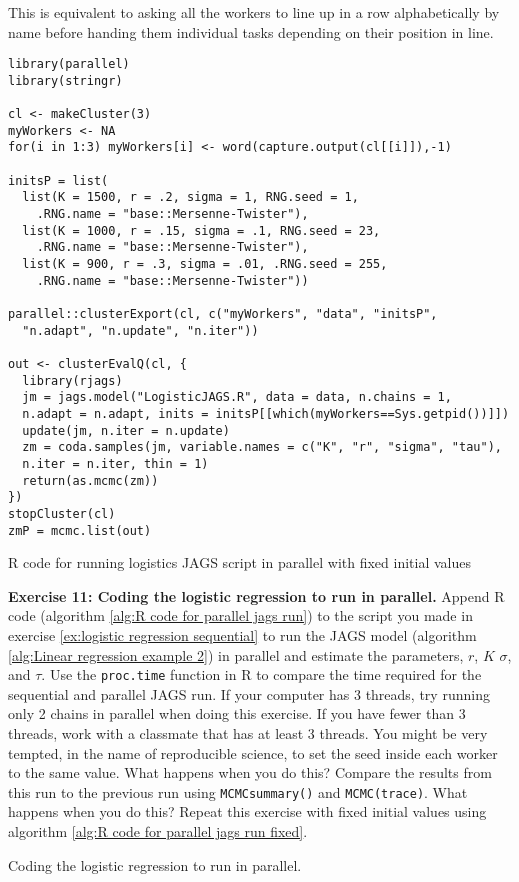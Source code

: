 \documentclass[12pt,english]{article}
\begin{document}
\noindent This is equivalent to asking all the workers to line up in a row alphabetically by name before handing them individual tasks depending on their position in line. 

\vspace{2.5cm}

\begin{algorithm}
\begin{Verbatim}[frame=single]
library(parallel)
library(stringr)

cl <- makeCluster(3)
myWorkers <- NA
for(i in 1:3) myWorkers[i] <- word(capture.output(cl[[i]]),-1)

initsP = list(
  list(K = 1500, r = .2, sigma = 1, RNG.seed = 1,
    .RNG.name = "base::Mersenne-Twister"),
  list(K = 1000, r = .15, sigma = .1, RNG.seed = 23,
    .RNG.name = "base::Mersenne-Twister"),
  list(K = 900, r = .3, sigma = .01, .RNG.seed = 255,
    .RNG.name = "base::Mersenne-Twister"))

parallel::clusterExport(cl, c("myWorkers", "data", "initsP", 
  "n.adapt", "n.update", "n.iter"))

out <- clusterEvalQ(cl, {
  library(rjags)
  jm = jags.model("LogisticJAGS.R", data = data, n.chains = 1, 
  n.adapt = n.adapt, inits = initsP[[which(myWorkers==Sys.getpid())]])
  update(jm, n.iter = n.update)
  zm = coda.samples(jm, variable.names = c("K", "r", "sigma", "tau"), 
  n.iter = n.iter, thin = 1)
  return(as.mcmc(zm))
}) 
stopCluster(cl)
zmP = mcmc.list(out)
\end{Verbatim}
\caption{R code for running logistics JAGS script in parallel with fixed initial values}
\label{alg:R code for parallel jags run fixed}
\end{algorithm}

\belowcaptionskip=-40pt
\begin{exercise}
\begin{mdframed}
\doublespacing
\textbf{Exercise 11: Coding the logistic regression to run in parallel.}  Append R code (algorithm \ref{alg:R code for parallel jags run}) to the script you made in exercise \ref{ex:logistic regression sequential} to run the JAGS model (algorithm \ref{alg:Linear regression example 2}) in parallel and estimate the parameters, $r$, $K$ $\sigma$, and $\tau$. Use the \texttt{proc.time} function in R to compare the time required for the sequential and parallel JAGS run. If your computer has 3 threads, try running only 2 chains in parallel when doing this exercise. If you have fewer than 3 threads, work with a classmate that has at least 3 threads. You might be very tempted, in the name of reproducible science, to set the seed inside each worker to the same value. What happens when you do this? Compare the results from this run to the previous run using \texttt{MCMCsummary()} and \texttt{MCMC(trace)}. What happens when you do this? Repeat this exercise with fixed initial values using algorithm \ref{alg:R code for parallel jags run fixed}. \end{mdframed}
\captionsetup{textformat=empty, labelformat=empty}
\caption[Coding the logistic regression to run in parallel]{Coding the logistic regression to run in parallel.}
\label{ex:logistic regression parallel}
\end{exercise}
\belowcaptionskip=0pt
\end{document}
